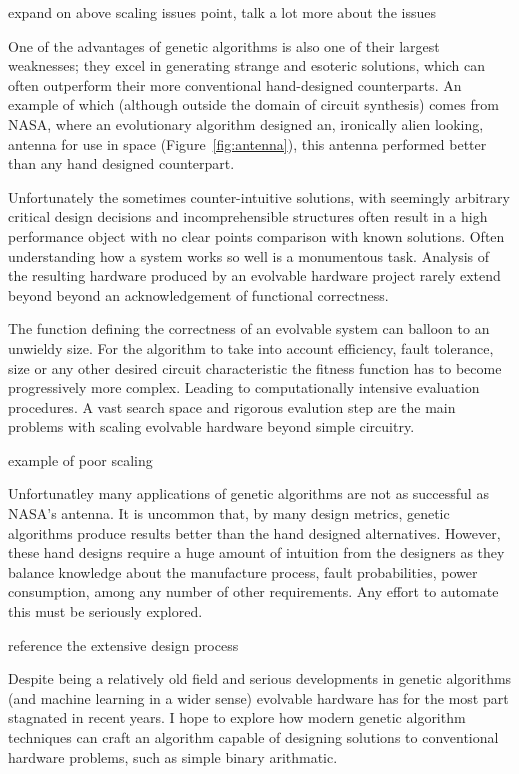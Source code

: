 \todo expand on above scaling issues point, talk a lot more about the issues

One of the advantages of genetic algorithms is also one of their largest
weaknesses; they excel in generating strange and esoteric solutions,
which can often outperform their more conventional hand-designed counterparts.
An example of which (although outside the domain of circuit synthesis)
comes from NASA, where an evolutionary algorithm designed an, ironically
alien looking, antenna for use in space (Figure~\ref{fig:antenna})\cite{Antenna}, this antenna performed better
than any hand designed counterpart.

Unfortunately the sometimes counter-intuitive solutions, with seemingly arbitrary
critical design decisions and incomprehensible structures often result in a high
performance object with no clear points
comparison with known solutions. Often understanding how a system
works so well is a monumentous task. Analysis of the resulting hardware
produced by an evolvable hardware project rarely
extend beyond beyond an acknowledgement of functional correctness.

The function defining the correctness of an evolvable system can balloon
to an unwieldy size. For the algorithm to take into account efficiency, fault tolerance, size
or any other desired circuit characteristic the fitness function has to
become progressively more complex. Leading to computationally intensive
evaluation procedures. A vast search space and rigorous evalution step
are the main problems with scaling evolvable hardware beyond simple circuitry.

\todo example of poor scaling

Unfortunatley many applications of genetic algorithms are not as
successful as NASA's antenna.
It is uncommon that, by many design metrics, genetic algorithms produce results
better than the hand designed alternatives. However, these hand designs require
a huge amount of intuition from the designers as they balance
knowledge about the manufacture process, fault probabilities, power
consumption, among any number of other requirements. Any effort to automate
this must be seriously explored.

\todo reference the extensive design process

Despite being a relatively old field and serious developments in genetic
algorithms (and machine learning in a wider sense) evolvable hardware has for
the most part stagnated in recent years. I hope to explore how modern
genetic algorithm techniques can craft an algorithm capable of designing solutions
to conventional hardware problems, such as simple binary arithmatic.

